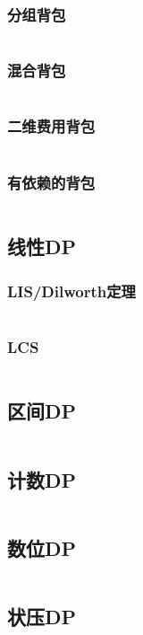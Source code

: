 \documentclass[a4paper,12pt]{article}
\begin{document}
\subsubsection{分组背包}
\inputminted[breaklines, linenos]{c++}{dp/bag/group.cc}
\subsubsection{混合背包}
\inputminted[breaklines, linenos]{c++}{dp/bag/mix.cc}
\subsubsection{二维费用背包}
\inputminted[breaklines, linenos]{c++}{dp/bag/2di.cc}
\subsubsection{有依赖的背包}
\inputminted[breaklines, linenos]{c++}{dp/bag/dep.cc}

\subsection{线性DP}
\subsubsection{LIS/Dilworth定理}
\inputminted[breaklines, linenos]{c++}{dp/linear/lis.cc}
\subsubsection{LCS}
\inputminted[breaklines, linenos]{c++}{dp/linear/lcs.cc}
\subsection{区间DP}
\inputminted[breaklines, linenos]{c++}{dp/interval.cc}
\subsection{计数DP}
\inputminted[breaklines, linenos]{c++}{dp/jishu.cc}
\subsection{数位DP}
\inputminted[breaklines, linenos]{c++}{dp/shuwei.cc}
\subsection{状压DP}
\inputminted[breaklines, linenos]{c++}{dp/zhuangya.cc}
\end{document}

